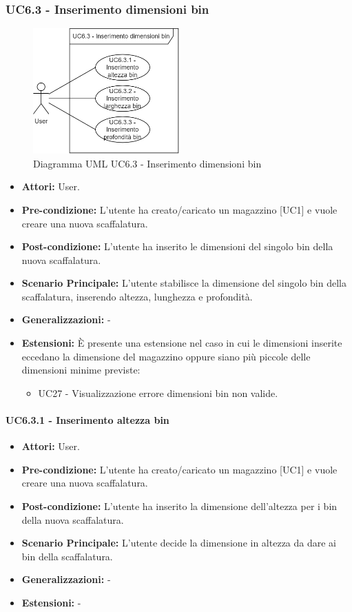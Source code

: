 \subsubsection{UC6.3 - Inserimento dimensioni bin}
\begin{figure}[H]
  \centering
  \includegraphics[width=0.5\textwidth]{UC_diagrams_1-10/UC6.3.drawio.png}
   \caption{Diagramma UML UC6.3 - Inserimento dimensioni bin}
\end{figure}
\begin{itemize}
    \item \textbf{Attori:} User.
    \item \textbf{Pre-condizione:} L'utente ha creato/caricato un magazzino [UC1] e vuole creare una nuova scaffalatura.
    \item \textbf{Post-condizione:}  L'utente ha inserito le dimensioni del singolo bin della nuova scaffalatura.
    \item \textbf{Scenario Principale:}  L'utente stabilisce la dimensione del singolo bin della scaffalatura, inserendo altezza, lunghezza e profondità.
    \item \textbf{Generalizzazioni:} -
    \item \textbf{Estensioni:} È presente una estensione nel caso in cui le dimensioni inserite eccedano la dimensione del magazzino oppure siano più piccole delle dimensioni minime previste:
    \begin{itemize}
        \item UC27 - Visualizzazione errore dimensioni bin non valide.
    \end{itemize}
\end{itemize}


\paragraph{UC6.3.1 - Inserimento altezza bin}
\begin{itemize}
    \item \textbf{Attori:} User.
    \item \textbf{Pre-condizione:} L'utente ha creato/caricato un magazzino [UC1] e vuole creare una nuova scaffalatura.
    \item \textbf{Post-condizione:}  L'utente ha inserito la dimensione dell'altezza per i bin della nuova scaffalatura.
    \item \textbf{Scenario Principale:}  L'utente decide la dimensione in altezza da dare ai bin della scaffalatura. 
    \item \textbf{Generalizzazioni:} -
    \item \textbf{Estensioni:} -
\end{itemize}


